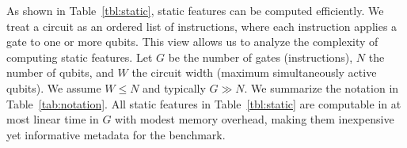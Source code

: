 As shown in Table~\ref{tbl:static}, static features can be computed efficiently.
We treat a circuit as an ordered list of instructions, where each instruction
applies a gate to one or more qubits. This view allows us to analyze the
complexity of computing static features. Let $G$ be the number of gates
(instructions), $N$ the number of qubits, and $W$ the circuit width (maximum
simultaneously active qubits). We assume $W \le N$ and typically $G \gg N$. We
summarize the notation in Table~\ref{tab:notation}. All static features in
Table~\ref{tbl:static} are computable in at most linear time in $G$ with modest
memory overhead, making them inexpensive yet informative metadata for the \sys
benchmark.

